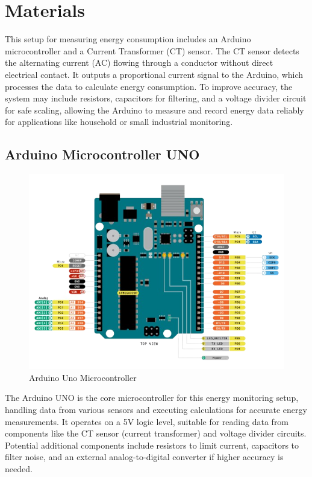 \section{Materials}
This setup for measuring energy consumption includes an Arduino microcontroller and a Current Transformer (CT) sensor. The CT sensor detects the alternating current (AC) flowing through a conductor without direct electrical contact. It outputs a proportional current signal to the Arduino, which processes the data to calculate energy consumption. To improve accuracy, the system may include resistors, capacitors for filtering, and a voltage divider circuit for safe scaling, allowing the Arduino to measure and record energy data reliably for applications like household or small industrial monitoring.

\subsection{Arduino Microcontroller UNO}
\begin{figure}[H]
    \centering
    \includegraphics[width=\linewidth]{Graphics/ard_uno-removebg-preview.png}
    \caption{Arduino Uno Microcontroller}
    \label{fig:image1}
\end{figure}
The Arduino UNO is the core microcontroller for this energy monitoring setup, handling data from various sensors and executing calculations for accurate energy measurements. It operates on a 5V logic level, suitable for reading data from components like the CT sensor (current transformer) and voltage divider circuits. Potential additional components include resistors to limit current, capacitors to filter noise, and an external analog-to-digital converter if higher accuracy is needed. \cite{OpenEnergyMonitor_Arduino}

